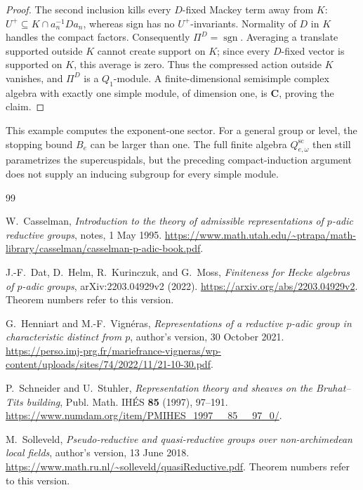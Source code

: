 \documentclass[10pt,letterpaper]{amsart}
\numberwithin{equation}{section}
\theoremstyle{remark}
\newcommand{\C}{\mathbf C}
\begin{document}
\begin{proof}
The second inclusion kills every $D$-fixed Mackey term away from $K$:
$U^+\subseteq K\cap a_n^{-1}Da_n$, whereas sign has no $U^+$-invariants.
Normality of $D$ in $K$ handles the compact factors. Consequently
$\Pi^D=\operatorname{sgn}$. Averaging a translate supported outside $K$
cannot create support on $K$; since every $D$-fixed vector is supported
on $K$, this average is zero. Thus the compressed action outside $K$
vanishes, and $\Pi^D$ is a $Q_1$-module. A finite-dimensional semisimple
complex algebra with
exactly one simple module, of dimension one, is $\C$, proving the claim.
\end{proof}

This example computes the exponent-one sector. For a general group or
level, the stopping bound $B_e$ can be larger than one. The full finite
algebra $Q^{\mathrm{sc}}_{e,\omega}$ then still parametrizes the
supercuspidals, but the preceding compact-induction argument does not
supply an inducing subgroup for every simple module.

\begin{thebibliography}{99}

W.~Casselman, \emph{Introduction to the theory of admissible representations
of $p$-adic reductive groups}, notes, 1 May 1995.
\url{https://www.math.utah.edu/~ptrapa/math-library/casselman/casselman-p-adic-book.pdf}.

J.-F.~Dat, D.~Helm, R.~Kurinczuk, and G.~Moss,
\emph{Finiteness for Hecke algebras of $p$-adic groups},
arXiv:2203.04929v2 (2022).
\url{https://arxiv.org/abs/2203.04929v2}.
Theorem numbers refer to this version.

G.~Henniart and M.-F.~Vign\'eras,
\emph{Representations of a reductive $p$-adic group in characteristic
distinct from $p$}, author's version, 30 October 2021.
\url{https://perso.imj-prg.fr/mariefrance-vigneras/wp-content/uploads/sites/74/2022/11/21-10-30.pdf}.

P.~Schneider and U.~Stuhler, \emph{Representation theory and sheaves on the
Bruhat--Tits building}, Publ. Math. IH\'ES \textbf{85} (1997), 97--191.
\url{https://www.numdam.org/item/PMIHES_1997__85__97_0/}.

M.~Solleveld, \emph{Pseudo-reductive and quasi-reductive groups over
non-archimedean local fields}, author's version, 13 June 2018.
\url{https://www.math.ru.nl/~solleveld/quasiReductive.pdf}.
Theorem numbers refer to this version.

\end{thebibliography}
\end{document}
